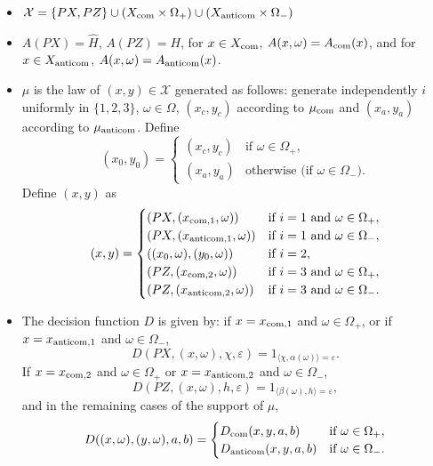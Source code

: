 \documentclass[10pt]{amsart}
\newcommand{\com}{\textup{com}}
\theoremstyle{plain}
\theoremstyle{definition}
\newcommand{\cX}{\mathcal{X}}
\newcommand{\anticom}{\textup{anticom}}
\begin{document}
\begin{itemize}
\item $\cX = \{PX,PZ\}\cup (X_{\com} \times \Omega_+) \cup (X_{\anticom} \times \Omega_-)$
\item $A(PX) = \hat H$, $A(PZ) = H$, for $x \in X_{\com}$, $A(x,\omega) = A_{\com}(x)$, and for $x \in X_{\anticom}$, $A(x,\omega)=A_{\anticom}(x)$.
\item $\mu$ is the law of $(x,y) \in \cX$ generated as follows: generate independently $i$ uniformly in $\{1,2,3\}$, $\omega \in \Omega$, $(x_c,y_c)$ according to $\mu_{\com}$ and $(x_a,y_a)$ according to $\mu_{\anticom}$. Define\vspace*{-3pt}
\[
(x_0,y_0) =\begin{cases} (x_c,y_c) &\text{if }\omega \in \Omega_+,\\
(x_a,y_a)&\text{otherwise (if }\omega \in \Omega_-).
\end{cases}
\]
Define $(x,y)$ as\vspace*{-3pt}
\begin{equation}\label{eq:def_mu}
(x,y) =\begin{cases}
(PX,(x_{\com,1},\omega)) &\text{if $i=1$ and $\omega \in \Omega_+$},\\
(PX,(x_{\anticom,1},\omega)) &\text{if $i=1$ and $\omega \in \Omega_-$},\\
((x_0,\omega),(y_0,\omega))&\text{if $i=2$},\\
(PZ,(x_{\com,2},\omega)) &\text{if $i=3$ and $\omega \in \Omega_+$},\\
(PZ,(x_{\anticom,2},\omega)) &\text{if $i=3$ and $\omega \in \Omega_-$}.\\
\end{cases}
\end{equation}
\item The decision function $D$ is given by: if $x=x_{\com,1}$ and $\omega \in \Omega_+$, or if $x=x_{\anticom,1}$ and $\omega \in \Omega_-$,
\[
D(PX,(x,\omega),\chi,\varepsilon) = 1_{\langle \chi,\alpha(\omega)\rangle = \varepsilon}.
\]If $x=x_{\com,2}$ and $\omega \in \Omega_+$ or $x=x_{\anticom,2}$ and $\omega \in \Omega_-$,
\[
D(PZ,(x,\omega),h,\varepsilon) = 1_{\langle \beta(\omega),h\rangle = \varepsilon},
\]
and in the remaining cases of the support of $\mu$,
\[
D((x,\omega),(y,\omega),a,b) = \begin{cases} D_{\com}(x,y,a,b)&\text{if }\omega \in \Omega_+,\\
D_{\anticom}(x,y,a,b)&\text{if }\omega \in \Omega_-.
\end{cases}
\]
\end{itemize}
\end{document}
